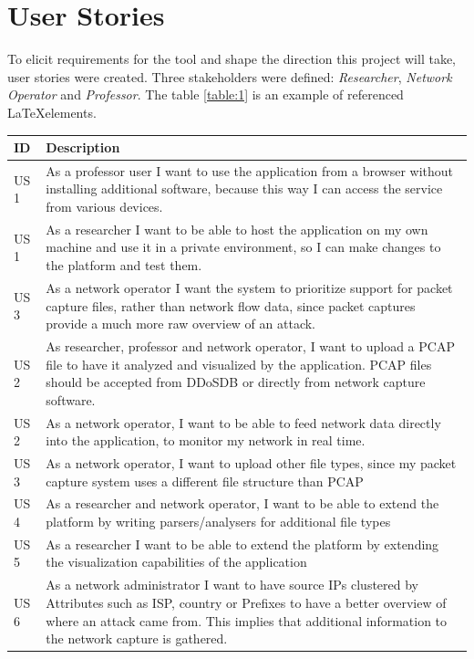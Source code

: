 \section{User Stories}
To elicit requirements for the tool and shape the direction this project will take, user stories were created. Three stakeholders were defined: \emph{Researcher}, \emph{Network Operator} and \emph{Professor}.
The table \ref{table:1} is an example of referenced \LaTeX elements.
\begin{table}[]
\centering
\begin{tabular}{|p{1.1cm}|p{12cm}|}
\hline
\textbf{ID} & \textbf{Description} \\ \hline

US 1         & As a professor user I want to use the application from a browser without installing additional software, because this way I can access the service from various devices.\\ \hline
US 1         & As a researcher I want to be able to host the application on my own machine and use it in a private environment, so I can make changes to the platform and test them.\\ \hline
US 3         & As a network operator I want the system to prioritize support for packet capture files, rather than network flow data, since packet captures provide a much more raw overview of an attack. \\ \hline
US 2         & As researcher, professor and network operator, I want to upload a PCAP file to have it analyzed and  visualized by the application. PCAP files should be accepted from DDoSDB or directly from network capture software.\\ \hline
US 2         & As a network operator, I want to be able to feed network data directly into the application, to monitor my network in real time.\\ \hline
US 3         & As a network operator, I want to upload other file types, since my packet capture system uses a different file structure than PCAP\\ \hline
US 4         & As a researcher and network operator, I want to be able to extend the platform by writing parsers/analysers for additional file types\\ \hline
US 5         & As a researcher I want to be able to extend the platform by extending the visualization capabilities of the application\\ \hline
US 6         & As a network administrator I want to have source IPs clustered by Attributes such as ISP, country or Prefixes to have a better overview of where an attack came from. This implies that additional information to the network capture is gathered.\\ \hline

\end{tabular}
\end{table}
